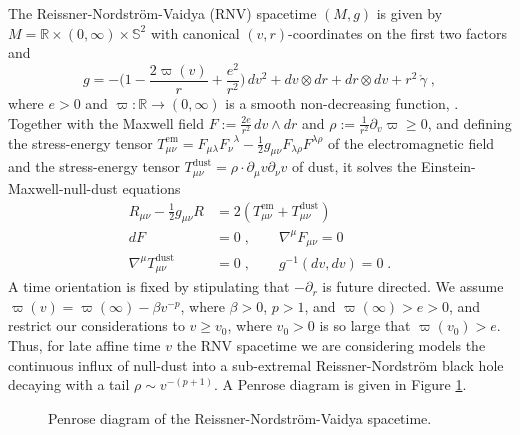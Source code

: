 \documentclass[reqno]{article}
\newcommand{\R}{\mathbb{R}}
\begin{document}
The Reissner-Nordstr\"om-Vaidya (RNV) spacetime $(M,g)$ is given by $M= \R \times (0,\infty) \times \mathbb{S}^2$ with canonical $(v,r)$-coordinates on the first two factors and 
\begin{equation}
\label{EqMetricRNVR}
g = -\Big(1 - \frac{2 \varpi (v)}{r} + \frac{e^2}{r^2}\Big) \, dv^2 + dv \otimes dr + dr \otimes dv + r^2 \, \mathring{\gamma} \;,
\end{equation} where $e>0$ and $\varpi : \R \to (0, \infty)$ is a smooth non-decreasing function, \cite{BonVai70}. Together with the Maxwell field $F := \frac{2e}{r^2} \, dv \wedge dr$ and $\rho := \frac{1}{r^2} \partial_v \varpi \geq 0$, and defining the stress-energy tensor $T^{\mathrm{em}}_{\mu \nu} = F_{\mu \lambda} F_{\nu}^{\; \; \lambda} - \frac{1}{2} g_{\mu \nu} F_{\lambda \rho} F^{\lambda \rho}$ of the electromagnetic field and the stress-energy tensor $ T^{\mathrm{dust}}_{\mu \nu} = \rho \cdot \partial_\mu v \partial_\nu v$ of dust, it solves the Einstein-Maxwell-null-dust equations
\begin{equation*}
\begin{aligned}
R_{\mu \nu} - \frac{1}{2} g_{\mu \nu} R &= 2(T^{\mathrm{em}}_{\mu \nu} + T^{\mathrm{dust}}_{\mu \nu} ) \\
dF &= 0 \;, \qquad \nabla^{\mu} F_{\mu \nu} = 0 \\
\nabla^\mu  T^{\mathrm{dust}}_{\mu \nu}  &= 0 \;, \qquad g^{-1}(dv, dv) = 0 \;.
\end{aligned}
\end{equation*}
A time orientation is fixed by stipulating that $-\partial_r$ is future directed. We assume $\varpi(v) = \varpi(\infty) - \beta v^{-p}$, where $\beta >0$, $p>1$, and $\varpi(\infty) > e >0$, and restrict our considerations to $v \geq v_0$, where $v_0 >0$ is so large that $\varpi(v_0) > e$. Thus, for late affine time $v$ the RNV spacetime we are considering models the continuous influx of null-dust into a sub-extremal Reissner-Nordstr\"om black hole decaying with a tail $\rho \sim v^{-(p+1)}$.   A Penrose diagram is given in Figure \ref{FigPenroseRNV}. 
\begin{figure}[h]
\centering
 \def\svgwidth{8cm}
   
      \caption{Penrose diagram of the Reissner-Nordstr\"om-Vaidya spacetime.} \label{FigPenroseRNV}
\end{figure}
\end{document}

